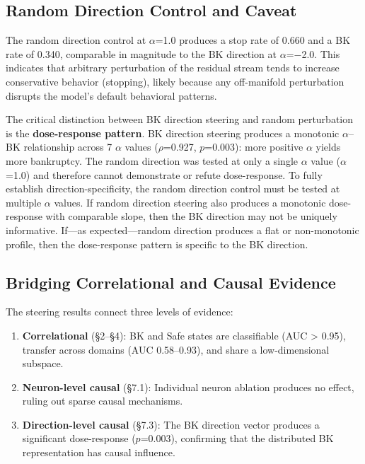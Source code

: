 \documentclass[11pt,a4paper]{article}
\begin{document}
\subsection{Random Direction Control and Caveat}

The random direction control at $\alpha$=1.0 produces a stop rate of 0.660 and a BK rate of 0.340, comparable in magnitude to the BK direction at $\alpha$=$-$2.0. This indicates that arbitrary perturbation of the residual stream tends to increase conservative behavior (stopping), likely because any off-manifold perturbation disrupts the model's default behavioral patterns.

The critical distinction between BK direction steering and random perturbation is the \textbf{dose-response pattern}. BK direction steering produces a monotonic $\alpha$--BK relationship across 7 $\alpha$ values ($\rho$=0.927, $p$=0.003): more positive $\alpha$ yields more bankruptcy. The random direction was tested at only a single $\alpha$ value ($\alpha$=1.0) and therefore cannot demonstrate or refute dose-response. To fully establish direction-specificity, the random direction control must be tested at multiple $\alpha$ values. If random direction steering also produces a monotonic dose-response with comparable slope, then the BK direction may not be uniquely informative. If---as expected---random direction produces a flat or non-monotonic profile, then the dose-response pattern is specific to the BK direction.

\subsection{Bridging Correlational and Causal Evidence}

The steering results connect three levels of evidence:

\begin{enumerate}[nosep]
    \item \textbf{Correlational} (\S2--\S4): BK and Safe states are classifiable (AUC > 0.95), transfer across domains (AUC 0.58--0.93), and share a low-dimensional subspace.
    \item \textbf{Neuron-level causal} (\S7.1): Individual neuron ablation produces no effect, ruling out sparse causal mechanisms.
    \item \textbf{Direction-level causal} (\S7.3): The BK direction vector produces a significant dose-response ($p$=0.003), confirming that the distributed BK representation has causal influence.
\end{enumerate}
\end{document}
